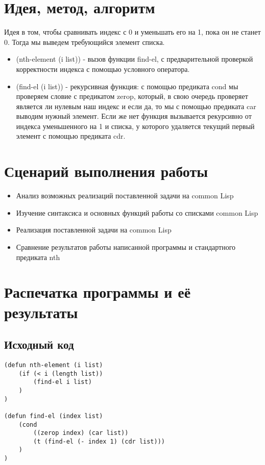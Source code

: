 \documentclass[12pt]{article}
\begin{document}
\section{Идея, метод, алгоритм}
Идея в том, чтобы сравнивать индекс с 0 и уменьшать его на 1, пока он не станет 0. Тогда мы выведем требующийся элемент списка.
\begin{itemize}
\setlength{\itemsep}{-1mm} %
\item (nth-element (i list)) - вызов функции find-el, с предварительной проверкой корректности индекса с помощью условного оператора.
\item (find-el (i list)) - рекурсивная функция: с помощью предиката cond мы проверяем словие с предикатом zerop, который, в свою очередь проверяет является ли нулевым наш индекс и если да, то мы с помощью предиката car выводим нужный элемент. Если же нет функция вызывается рекурсивно от индекса уменьшенного на 1 и списка, у которого удаляется текущий первый элемент с помощью предиката cdr.
\end{itemize}

\section{Сценарий выполнения работы}
\begin{itemize}
\setlength{\itemsep}{-1mm}
\item Анализ возможных реализаций поставленной задачи на common Lisp
\item Изучение синтаксиса и основных функций работы со списками common Lisp
\item Реализация поставленной задачи на common Lisp
\item Сравнение результатов работы написанной программы и стандартного предиката nth
\end{itemize}
\section{Распечатка программы и её результаты}

\subsection{Исходный код}
\begin{verbatim}
(defun nth-element (i list)
    (if (< i (length list))
        (find-el i list)
    )
)

(defun find-el (index list)
    (cond
        ((zerop index) (car list))
        (t (find-el (- index 1) (cdr list)))
    )
)
\end{verbatim}
\end{document}
